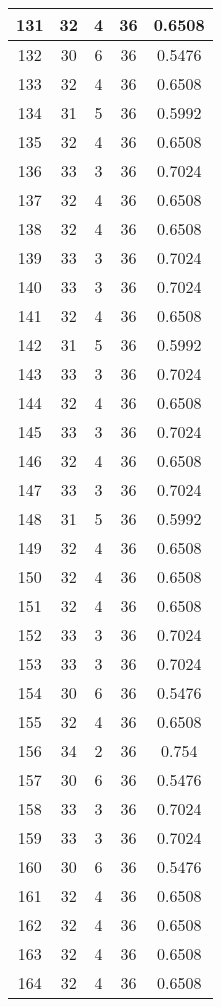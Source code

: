\documentclass[letterpaper, 12pt]{article}
\begin{document}
\begin{longtable}{|c|c|c|c|c|}
\hline
131 & 32 & 4 & 36 & 0.6508 \\
\hline
132 & 30 & 6 & 36 & 0.5476 \\
\hline
133 & 32 & 4 & 36 & 0.6508 \\
\hline
134 & 31 & 5 & 36 & 0.5992 \\
\hline
135 & 32 & 4 & 36 & 0.6508 \\
\hline
136 & 33 & 3 & 36 & 0.7024 \\
\hline
137 & 32 & 4 & 36 & 0.6508 \\
\hline
138 & 32 & 4 & 36 & 0.6508 \\
\hline
139 & 33 & 3 & 36 & 0.7024 \\
\hline
140 & 33 & 3 & 36 & 0.7024 \\
\hline
141 & 32 & 4 & 36 & 0.6508 \\
\hline
142 & 31 & 5 & 36 & 0.5992 \\
\hline
143 & 33 & 3 & 36 & 0.7024 \\
\hline
144 & 32 & 4 & 36 & 0.6508 \\
\hline
145 & 33 & 3 & 36 & 0.7024 \\
\hline
146 & 32 & 4 & 36 & 0.6508 \\
\hline
147 & 33 & 3 & 36 & 0.7024 \\
\hline
148 & 31 & 5 & 36 & 0.5992 \\
\hline
149 & 32 & 4 & 36 & 0.6508 \\
\hline
150 & 32 & 4 & 36 & 0.6508 \\
\hline
151 & 32 & 4 & 36 & 0.6508 \\
\hline
152 & 33 & 3 & 36 & 0.7024 \\
\hline
153 & 33 & 3 & 36 & 0.7024 \\
\hline
154 & 30 & 6 & 36 & 0.5476 \\
\hline
155 & 32 & 4 & 36 & 0.6508 \\
\hline
156 & 34 & 2 & 36 & 0.754 \\
\hline
157 & 30 & 6 & 36 & 0.5476 \\
\hline
158 & 33 & 3 & 36 & 0.7024 \\
\hline
159 & 33 & 3 & 36 & 0.7024 \\
\hline
160 & 30 & 6 & 36 & 0.5476 \\
\hline
161 & 32 & 4 & 36 & 0.6508 \\
\hline
162 & 32 & 4 & 36 & 0.6508 \\
\hline
163 & 32 & 4 & 36 & 0.6508 \\
\hline
164 & 32 & 4 & 36 & 0.6508 \\

\end{longtable}
\end{document}
